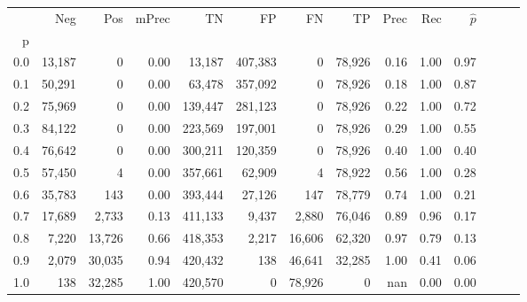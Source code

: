 \begin{tabular}{rrrrrrrrrrrrrr}
\toprule
{} &     Neg &     Pos & mPrec &       TN &       FP &      FN &      TP &  Prec &   Rec & $\hat{p}$ \\
p   &         &         &       &          &          &         &         &       &       &           \\
\midrule
0.0 &  13,187 &       0 &  0.00 &   13,187 &  407,383 &       0 &  78,926 &  0.16 &  1.00 &      0.97 \\
0.1 &  50,291 &       0 &  0.00 &   63,478 &  357,092 &       0 &  78,926 &  0.18 &  1.00 &      0.87 \\
0.2 &  75,969 &       0 &  0.00 &  139,447 &  281,123 &       0 &  78,926 &  0.22 &  1.00 &      0.72 \\
0.3 &  84,122 &       0 &  0.00 &  223,569 &  197,001 &       0 &  78,926 &  0.29 &  1.00 &      0.55 \\
0.4 &  76,642 &       0 &  0.00 &  300,211 &  120,359 &       0 &  78,926 &  0.40 &  1.00 &      0.40 \\
0.5 &  57,450 &       4 &  0.00 &  357,661 &   62,909 &       4 &  78,922 &  0.56 &  1.00 &      0.28 \\
0.6 &  35,783 &     143 &  0.00 &  393,444 &   27,126 &     147 &  78,779 &  0.74 &  1.00 &      0.21 \\
0.7 &  17,689 &   2,733 &  0.13 &  411,133 &    9,437 &   2,880 &  76,046 &  0.89 &  0.96 &      0.17 \\
0.8 &   7,220 &  13,726 &  0.66 &  418,353 &    2,217 &  16,606 &  62,320 &  0.97 &  0.79 &      0.13 \\
0.9 &   2,079 &  30,035 &  0.94 &  420,432 &      138 &  46,641 &  32,285 &  1.00 &  0.41 &      0.06 \\
1.0 &     138 &  32,285 &  1.00 &  420,570 &        0 &  78,926 &       0 &   nan &  0.00 &      0.00 \\
\bottomrule
\end{tabular}
